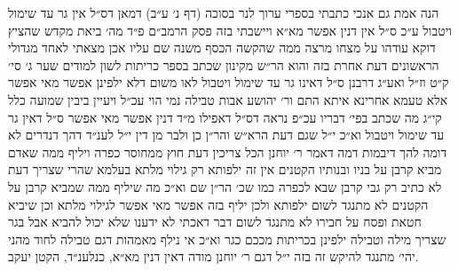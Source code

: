 \documentclass[12pt, openany]{book}
\begin{document}
\begin{multicols}{2}
הנה אמת גם אנכי כתבתי בספרי ערוך לנר בסוכה (דף נ׳ ע״ב) דמאן דס״ל אין גר עד שימול ויטבול ע״כ ס״ל אין דנין אפשר מא״א ויישבתי בזה פסק הרמב״ם פ״ד מה׳ ביאת מקדש שהציץ דוקא עודהו על מצחו מרצה ממה שהקשה הכסף משנה שם עליו אכן מצאתי לאחד מגדולי הראשונים דעת אחרת בזה והוא הר״ש מקינון שכתב בספר כריתות לשון למודים שער ג׳ סי׳ ק״ט וז״ל ואע״ג דרבנן ס״ל דאינו גר עד שימול ויטבול לאו משום דלא ילפינן אפשר מאי אפשר אלא טעמא אחרינא איתא התם ור׳ יהושע אבות טבילה נמי הוי עכ״ל ויעיין ביבין שמועה כלל קי״ג מה שכתב בפי׳ דבריו עכ״פ נראה דס״ל דאפילו מ״ד דנין אפשר מאי אפשר ס״ל דאין גר עד שימול ויטבול וא״כ י״ל שגם דעת הרא״ש והר״ן כן ולבר מן דין י״ל לענ״ד דהך דנדרים לא דומה להך דיבמות דמה דאמר ר׳ יוחנן הכל צריכין דעת חוץ ממחוסר כפרה ויליף ממה שאדם מביא קרבן על בניו ובנותיו הקטנים אין זה ילפותא רק גילוי מלתא בעלמא שהרי שצריך דעת לא כתיב רק גבי קרבן שבא לכפרה כמו שכ׳ הר״ן שם וא״כ מה שיליף ממה שמביא קרבן על הקטנים לא מתנגד לשום ילפותא ולכן יליף בזה אפשר מאי אפשר לגילוי מלתא וכן שיביא חטאת ופסח על חבירו לא מתנגד לשום דבר דאכתי לא ידענו שלא יכול להביא אבל בגר שצריך מילה וטבילה ילפינן בכריתות מככם כגר וא״כ אי נילף מאמהות דגם טבילה לחוד מהני יהי׳ מתנגד להיקש זה בזה י״ל דגם ר׳ יוחנן מודה דאין דנין מא״א, כנלענ״ד, הקטן יעקב.\\\vspace{0pt}

\end{multicols}\newpage
\end{document}
